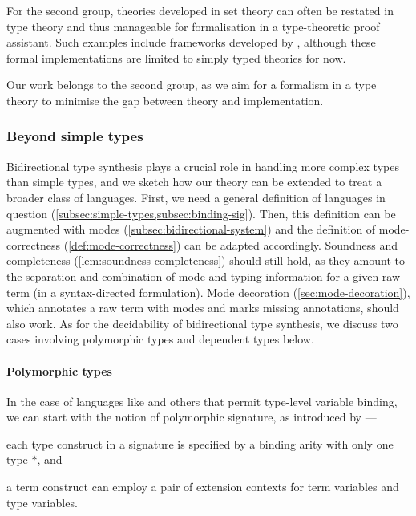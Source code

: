 For the second group, theories developed in set theory can often be restated in type theory and thus manageable for formalisation in a type-theoretic proof assistant. 
Such examples include frameworks developed by \citet{Ahrens2022,Allais2021,Fiore2022}, although these formal implementations are limited to simply typed theories for now.

Our work belongs to the second group, as we aim for a formalism in a type theory to minimise the gap between theory and implementation.

\subsubsection{Beyond simple types}

Bidirectional type synthesis plays a crucial role in handling more complex types than simple types, and we sketch how our theory can be extended to treat a broader class of languages.
First, we need a general definition of languages in question (\cref{subsec:simple-types,subsec:binding-sig}).
Then, this definition can be augmented with modes (\cref{subsec:bidirectional-system}) and the definition of mode-correctness (\cref{def:mode-correctness}) can be adapted accordingly.
Soundness and completeness (\cref{lem:soundness-completeness}) should still hold, as they amount to the separation and combination of mode and typing information for a given raw term (in a syntax-directed formulation).
Mode decoration (\cref{sec:mode-decoration}), which annotates a raw term with modes and marks missing annotations, should also work.
As for the decidability of bidirectional type synthesis, we discuss two cases involving polymorphic types and dependent types below.

\paragraph{Polymorphic types}
In the case of languages like \SystemF and others that permit type-level variable binding, we can start with the notion of polymorphic signature, as introduced by \citet{Hamana2011}---\begin{inlineenum}
  \item each type construct in a signature is specified by a binding arity with only one type $*$, and
  \item a term construct can employ a pair of extension contexts for term variables and type variables.
\end{inlineenum}

